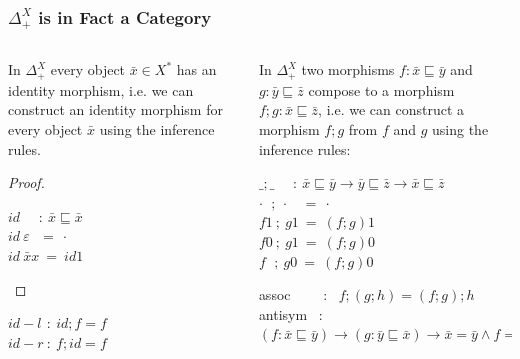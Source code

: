 \documentclass[aspectratio=169]{beamer}
\theoremstyle{remarkstyle}
\begin{document}
\begin{frame}[fragile]
  \frametitle{$Δ_+^X$ is in Fact a Category}
  \begin{columns}
    \begin{column}{0.33\textwidth}
      \begin{lemma}
        \begin{small}
          In $Δ_+^X$ every object $\bar{x} ∈ X^*$ has an identity morphism, 
          i.e. we can construct an identity morphism for every object $\bar{x}$ using the inference rules.
        \end{small}
      \end{lemma}
      \begin{proof}
        \begin{small}
        $id \ \ \ \ \ \ : \ \bar{x} ⊑ \bar{x}$\\
        $id \ ε \ \ \ = \ ·$\\
        $id \ \bar{x} x \ = \ id 1$
        \end{small}
      \end{proof}
      \begin{corollary}
        \begin{small}
        $id-l \ \, : \ id ; f = f$ \\
        $id-r \ : \ f;id = f$
        \end{small}
      \end{corollary}  
    \end{column}
    \begin{column}{0.62\textwidth}
      \begin{definition}
        
        In $Δ_+^X$ two morphisms $f : \bar{x} ⊑ \bar{y}$ and $g : \bar{y} ⊑ \bar{z}$ 
        compose to a morphism $f;g : \bar{x} ⊑ \bar{z}$, 
        i.e. we can construct a morphism $f;g$ from $f$ and $g$ using the inference rules:

        \vspace{8mm}

        $\_;\_ \ \ \ \ \ \ : \ \bar{x} ⊑ \bar{y} → \bar{y} ⊑ \bar{z} → \bar{x} ⊑ \bar{z}$\\
        $·  \ \ \, ; \ · \ \ \ \ = \ ·$\\
        $f 1  \ ; \ g 1 \ = \ (f;g)1$\\
        $f 0 \ ; \ g 1  \ = \ (f;g)0$\\
        $f \ \ \, ; \ g 0 \ = \ (f;g)0$
        
      \end{definition}
      \begin{corollary}
        \begin{small}
        assoc \ \ \ \ : \ $f;(g;h) = (f;g);h$\\
        antisym \ : \ $(f : \bar{x} ⊑ \bar{y}) → (g : \bar{y} ⊑ \bar{x}) → \bar{x} = \bar{y} \land f = g = id \ \bar{x}$
        \end{small}
      \end{corollary}  
    \end{column}
  \end{columns}
\end{frame}
\end{document}
